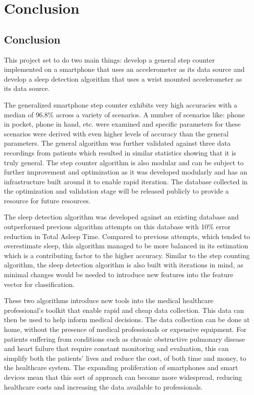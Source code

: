 \part{Conclusion}
\chapter{Conclusion}

This project set to do two main things: develop a general step counter implemented on a smartphone that uses an accelerometer as its data source and develop a sleep detection algorithm that uses a wrist mounted accelerometer as its data source. 

The generalized smartphone step counter exhibits very high accuracies with a median of 96.8\% across a variety of scenarios. A number of scenarios like: phone in pocket, phone in hand, etc. were examined and specific parameters for these scenarios were derived with even higher levels of accuracy than the general parameters. The general algorithm was further validated against three data recordings from patients which resulted in similar statistics showing that it is truly general. The step counter algorithm is also modular and can be subject to further improvement and optimization as it was developed modularly and has an infrastructure built around it to enable rapid iteration. The database collected in the optimization and validation stage will be released publicly to provide a resource for future resources.

The sleep detection algorithm was developed against an existing database and outperformed previous algorithm attempts on this database with 10\% error reduction in Total Asleep Time. Compared to previous attempts, which tended to overestimate sleep, this algorithm managed to be more balanced in its estimation which is a contributing factor to the higher accuracy. Similar to the step counting algorithm, the sleep detection algorithm is also built with iterations in mind, as minimal changes would be needed to introduce new features into the feature vector for classification. 

These two algorithms introduce new tools into the medical healthcare professional's toolkit that enable rapid and cheap data collection. This data can then be used to help inform medical decisions. The data collection can be done at home, without the presence of medical professionals or expensive equipment. For patients suffering from conditions such as chronic obstructive pulmonary disease and heart failure that require constant monitoring and evaluation, this can simplify both the patients' lives and reduce the cost, of both time and money, to the healthcare system. The expanding proliferation of smartphones and smart devices mean that this sort of approach can become more widespread, reducing healthcare costs and increasing the data available to professionals. 